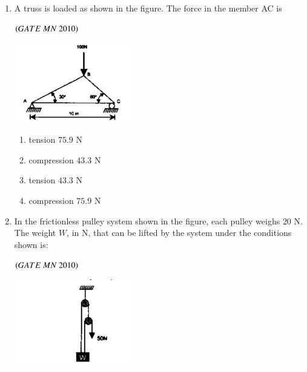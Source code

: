 \documentclass{article}
\begin{document}
\begin{enumerate}[label=Q.\arabic*., itemsep=1em, leftmargin=0pt, itemindent=*, labelsep=0.5em]
\begin{enumerate}[label=Q.\arabic*., start=17, leftmargin=2em]
\begin{multicols}{4}
\begin{enumerate}[label=(\Alph*),leftmargin=4em]
\item $5750$
\item $5630$
\end{enumerate}
\end{multicols}
\bigskip
\item A truss is loaded as shown in the figure. The force in the member AC is
\\
\begin{flushright}
\hfill$\left(GATE\ MN\ 2010\right)$
\end{flushright}
\begin{center}
\includegraphics[width=0.4\textwidth]{figs/truss.png}    
\end{center}
\begin{multicols}{2}
\begin{enumerate}[label=(\Alph*),leftmargin=4em]
\item tension $75.9$ N
\item compression $43.3$ N
\item tension $43.3$ N
\item compression $75.9$ N
\end{enumerate}
\end{multicols}
\bigskip
\item In the frictionless pulley system shown in the figure, each pulley weighs $20$ N.  
The weight \( W \), in N, that can be lifted by the system under the conditions shown is:
\\
\begin{flushright}
\hfill$\left(GATE\ MN\ 2010\right)$
\end{flushright}
\begin{center}
\includegraphics[width=0.4\textwidth]{figs/pulley.png}
\end{center}

\end{enumerate}
\end{enumerate}
\end{document}
